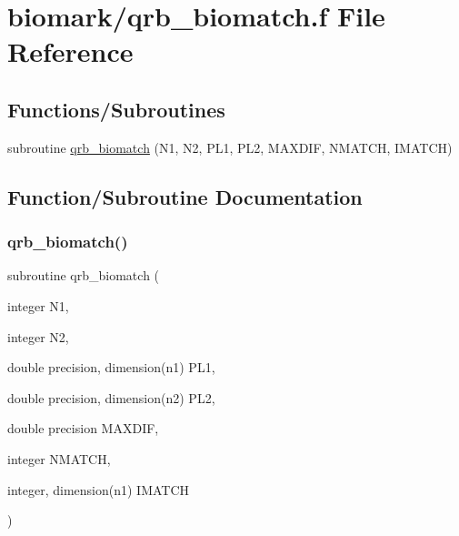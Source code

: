 \hypertarget{qrb__biomatch_8f}{}\section{biomark/qrb\+\_\+biomatch.f File Reference}
\label{qrb__biomatch_8f}
\subsection*{Functions/\+Subroutines}
\begin{DoxyCompactItemize}
\item 
subroutine \hyperlink{qrb__biomatch_8f_a3f6d9fcc34e883441615b0e9b1c33bfe}{qrb\+\_\+biomatch} (N1, N2, P\+L1, P\+L2, M\+A\+X\+D\+IF, N\+M\+A\+T\+CH, I\+M\+A\+T\+CH)
\end{DoxyCompactItemize}


\subsection{Function/\+Subroutine Documentation}
\mbox{\label{qrb__biomatch_8f_a3f6d9fcc34e883441615b0e9b1c33bfe}} 
\subsubsection{\texorpdfstring{qrb\+\_\+biomatch()}{qrb\_biomatch()}}
{\footnotesize\ttfamily subroutine qrb\+\_\+biomatch (\begin{DoxyParamCaption}\item[{integer}]{N1,  }\item[{integer}]{N2,  }\item[{double precision, dimension(n1)}]{P\+L1,  }\item[{double precision, dimension(n2)}]{P\+L2,  }\item[{double precision}]{M\+A\+X\+D\+IF,  }\item[{integer}]{N\+M\+A\+T\+CH,  }\item[{integer, dimension(n1)}]{I\+M\+A\+T\+CH }\end{DoxyParamCaption})}

